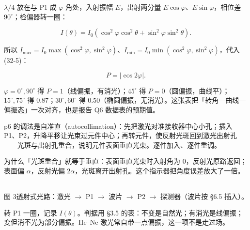 \documentclass[11pt]{ctexart}
\begin{document}
$\lambda/4$ 放在与 P1 成 $\varphi$ 角处，入射振幅 $E$，出射两分量 $E\cos\varphi$、$E\sin\varphi$，相位差 $90^\circ$；检偏器转一圈：

\[ I(\theta)=I_0\left(\cos^2\varphi\cos^2\theta+\sin^2\varphi\sin^2\theta\right). \]

所以 $I_{\max}=I_0\max(\cos^2\varphi,\sin^2\varphi)$、$I_{\min}=I_0\min(\cos^2\varphi,\sin^2\varphi)$，代入 (32-5)：

\[ P=|\cos 2\varphi|. \]

$\varphi=0^\circ,90^\circ$ 得 $P=1$（线偏振，有消光）；$45^\circ$ 得 $P=0$（圆偏振，曲线平）；$15^\circ,75^\circ$ 得 $0.87$；$30^\circ,60^\circ$ 得 $0.50$（椭圆偏振，无消光）。这张表把「转角—曲线—偏振态」一次对齐，也是报告 Q6 数据表的预期值。



p6 的调法是自准直（autocollimation）：先把激光对准接收器中心小孔；插入 P1、P2，升降平移让光束过元件中心；再转元件，使反射光斑回到激光出射孔——光斑与出射孔重合，说明元件表面垂直光束。逐件加入、逐件重调。

为什么「光斑重合」就等于垂直：表面垂直光束时入射角为 $0$，反射光原路返回；表面偏 $\alpha$，反射光偏 $2\alpha$，光斑离开出射孔。这个指示器把角度误差放大了一倍。

\begin{center}
\\[3pt]
{\small\color{inkgray} 图 3\quad 透射式光路：激光 $\to$ P1 $\to$ 波片 $\to$ P2 $\to$ 探测器（波片按 §6.5 插入）。}
\end{center}


转 P1 一圈，记录 $I(\theta)$。判据用 §3.5 的表：不变是自然光；有消光是线偏振；变但消不光为部分偏振。He--Ne 激光常自带一点偏振，这一项不是走过场。
\end{document}
